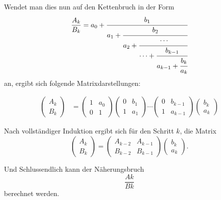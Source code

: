 Wendet man dies nun auf den Kettenbruch in der Form
\begin{equation*}
	\frac{A_k}{B_k} = a_0 + \cfrac{b_1}{a_1+\cfrac{b_2}{a_2+\cfrac{\cdots}{\cdots+\cfrac{b_{k-1}}{a_{k-1} + \cfrac{b_k}{a_k}}}}}
\end{equation*}
an, ergibt sich folgende Matrixdarstellungen:

\begin{align*}
	\begin{pmatrix}
		A_k\\
		B_k
	\end{pmatrix}
	&=
	\begin{pmatrix}
		1& a_0\\
		0& 1
	\end{pmatrix}
	\begin{pmatrix}
		0& b_1\\
		1& a_1
	\end{pmatrix}
	\cdots
	\begin{pmatrix}
		0& b_{k-1}\\
		1& a_{k-1}
	\end{pmatrix}
	\begin{pmatrix}
		b_k\\
		a_k
	\end{pmatrix}
\end{align*}

Nach vollständiger Induktion ergibt sich für den Schritt $k$, die Matrix
\begin{equation}
	\label{0f1:math:matrix:ende:eq}
	 \begin{pmatrix}
		A_{k}\\
		B_{k}			
	\end{pmatrix} 
	=
		\begin{pmatrix}
		A_{k-2}& A_{k-1}\\
		B_{k-2}& B_{k-1}			
	\end{pmatrix}
		\begin{pmatrix}
		b_k\\
		a_k
	\end{pmatrix}.
\end{equation}

Und Schlussendlich kann der Näherungsbruch
\[
\frac{Ak}{Bk}
\] 
berechnet werden.


